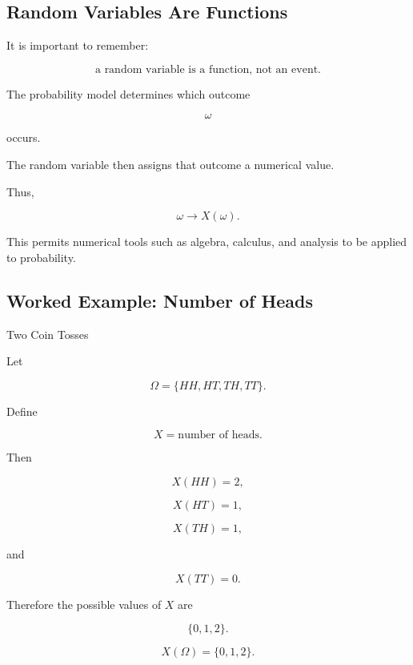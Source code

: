 \subsection{Random Variables Are Functions}
\label{subsec:random-variables-functions}

It is important to remember:

\[
\boxed{
\text{a random variable is a function, not an event}.
}
\]

The probability model determines which outcome

\[
\omega
\]

occurs.

The random variable then assigns that outcome a numerical value.

Thus,

\[
\boxed{
\omega
\longrightarrow
X(\omega).
}
\]

This permits numerical tools such as algebra, calculus, and analysis to
be applied to probability.

\subsection{Worked Example: Number of Heads}
\label{subsec:worked-rv-heads}

\begin{workedexamplebox}{Two Coin Tosses}

Let

\[
\Omega
=
\{HH,HT,TH,TT\}.
\]

Define

\[
X
=
\text{number of heads}.
\]

Then

\[
X(HH)=2,
\]

\[
X(HT)=1,
\]

\[
X(TH)=1,
\]

and

\[
X(TT)=0.
\]

Therefore the possible values of \(X\) are

\[
\{0,1,2\}.
\]

\begin{answerbox}
\[
\boxed{
X(\Omega)=\{0,1,2\}.
}
\]
\end{answerbox}

\end{workedexamplebox}

